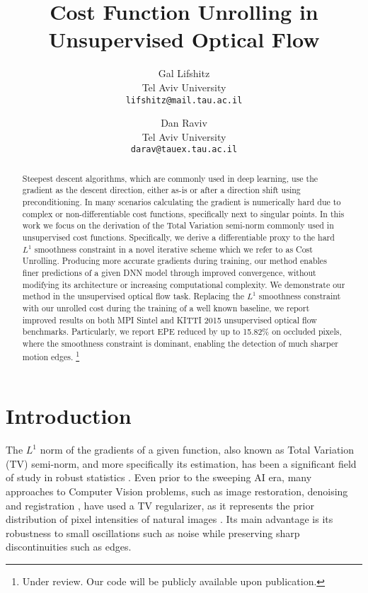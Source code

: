 \documentclass[10pt,twocolumn,letterpaper]{article}
\begin{document}
\title{Cost Function Unrolling in Unsupervised Optical Flow}

\author{Gal Lifshitz\\
Tel Aviv University\\
{\tt\small lifshitz@mail.tau.ac.il}
\and
Dan Raviv\\
Tel Aviv University\\
{\tt\small darav@tauex.tau.ac.il}
}
\maketitle

\begin{abstract}

Steepest descent algorithms, which are commonly used in deep learning, use the gradient as the descent direction, either as-is or after a direction shift using preconditioning. 
In many scenarios calculating the gradient is numerically hard due to complex or non-differentiable cost functions, specifically next to singular points. 
In this work we focus on the derivation of the Total Variation semi-norm commonly used in unsupervised cost functions.
Specifically, we derive a differentiable proxy to the hard $L^1$ smoothness constraint in a novel iterative scheme which we refer to as Cost Unrolling.
Producing more accurate gradients during training, our method enables finer predictions of a given DNN model through improved convergence, without modifying its architecture or increasing computational complexity.
We demonstrate our method in the unsupervised optical flow task. Replacing the $L^1$ smoothness constraint with our unrolled cost during the training of a well known baseline, we report improved results on both MPI Sintel and KITTI 2015 unsupervised optical flow benchmarks.
Particularly, we report EPE reduced by up to 15.82\% on occluded pixels, where the smoothness constraint is dominant, enabling the detection of much sharper motion edges.
\footnote{Under review. Our code will be publicly available upon publication.}






\end{abstract}

 \section{Introduction}

The $L^1$ norm of the gradients of a given function, also known as Total Variation (TV) semi-norm, and more specifically its estimation, has been a significant field of study in robust statistics \cite{Huber.Wiley.ea1981Robuststatistics}. Even prior to the sweeping AI era, many approaches to Computer Vision problems, such as image restoration, denoising and registration \cite{RUDIN1992259,doi:10.1080/00207160500069904,zach2007duality}, have used a TV regularizer, as it represents the prior distribution of pixel intensities of natural images \cite{786990}. Its main  advantage is its robustness to small oscillations such as noise while preserving sharp discontinuities such as edges.
\end{document}
